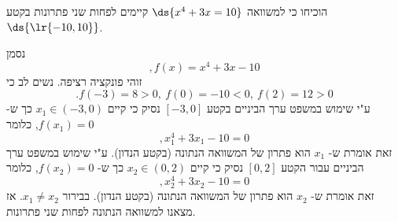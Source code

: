 הוכיחו כי למשוואה
$\ds{x^4+3x=10}$
קיימים לפחות שני פתרונות בקטע $\ds{\lr{-10,10}}$.
\begin{solbox}
נסמן
$$,f(x)=x^4+3x-10$$
זוהי פונקציה רציפה.
נשים לב כי
$$.f(-3)=8>0,\ f(0)=-10<0,\ f(2)=12>0$$
ע"י שימוש במשפט ערך הביניים  בקטע
$[-3,0]$
נסיק כי קיים
$x_1\in(-3,0)$
כך ש-
$f(x_1)=0$,
כלומר
$$,x_1^4+3x_1-10=0$$
זאת אומרת ש-
$x_1$
הוא פתרון של המשוואה הנתונה
(בקטע הנדון).
ע"י שימוש במשפט ערך הביניים עבור הקטע
$[0,2]$
נסיק כי קיים
$x_2\in(0,2)$
כך ש-
$f(x_2)=0$,
כלומר
$$,x_2^4+3x_2-10=0$$
זאת אומרת ש-
$x_2$
הוא פתרון של המשוואה הנתונה
(בקטע הנדון).
בבירור
$x_1\neq x_2$.
אז מצאנו למשוואה הנתונה לפחות שני פתרונות.
\end{solbox}
